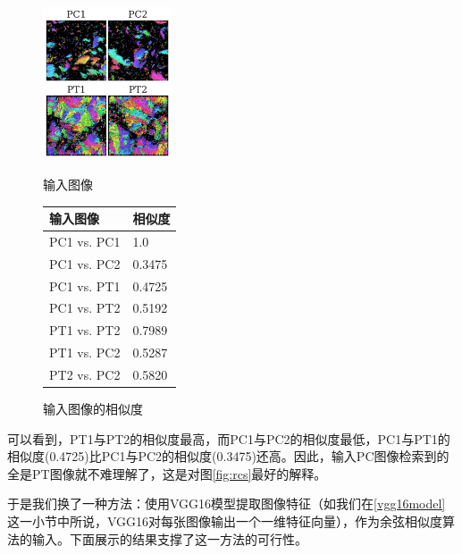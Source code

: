 \begin{figure}[H]
	\begin{minipage} [b]{.45\linewidth}
		\centering
		\includegraphics[width=3.8cm]{../figures/retrieval/PCPT.pdf}
		\caption{输入图像}\label{fig:cs}
	\end{minipage}
	\begin{minipage} [b]{.55\linewidth}
		\begin{tabular}{C{3cm}|L{3cm}}
			\hline
			输入图像 & \hspace{1.8em}相似度 \\
			\hline
			PC1 vs. PC1 & \hspace{2em}1.0\\
			PC1 vs. PC2 & \hspace{2em}0.3475\\
			PC1 vs. PT1 & \hspace{2em}0.4725\\
			PC1 vs. PT2 & \hspace{2em}0.5192\\
			PT1 vs. PT2 & \hspace{2em}0.7989\\
			PT1 vs. PC2 & \hspace{2em}0.5287\\
			PT2 vs. PC2	& \hspace{2em}0.5820\\
			\hline
		\end{tabular}
		\captionsetup{type=table}
		\label{table:cs}
		\caption{输入图像的相似度}
	\end{minipage}
\end{figure}
可以看到，PT1与PT2的相似度最高，而PC1与PC2的相似度最低，PC1与PT1的相似度(0.4725)比PC1与PC2的相似度(0.3475)还高。因此，输入PC图像检索到的全是PT图像就不难理解了，这是对图\ref{fig:rcs}最好的解释。

于是我们换了一种方法：使用VGG16模型提取图像特征（如我们在\ref{vgg16model}这一小节中所说，VGG16对每张图像输出一个一维特征向量），作为余弦相似度算法的输入。下面展示的结果支撑了这一方法的可行性。

